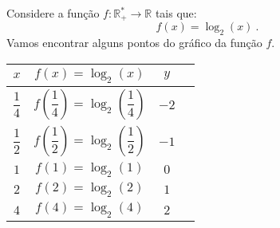  \begin{exem} \label{ex:log-2}
  Considere a função $f: \mathbb{R_{+}^{*}} \rightarrow \mathbb{R} $ tais que:
\begin{equation*}
f(x) = \log_{2}(x) \ .
\end{equation*}
 Vamos encontrar alguns pontos do gráfico da função $f$.

  \begin{table}[H]
 \centering
 \begin{tabular}{|c|c|c|c|} \hline
 \rowcolor{gray}
 $x$ & $f(x) = \log_{2}(x)$ & $y$ \\ \hline
  $\dfrac{1}{4}$ & $f\left(\dfrac{1}{4}\right)= \log_{2}\left(\dfrac{1}{4}\right)$ & $-2$ \\ \hline
 $\dfrac{1}{2}$ & $f\left(\dfrac{1}{2}\right)= \log_{2}\left(\dfrac{1}{2}\right)$ & $-1$ \\ \hline
 $1$ & $f(1)= \log_{2}(1)$ & $0$ \\ \hline
 $2$ & $f(2)= \log_{2}(2)$ & $1$ \\ \hline
 $4$ & $f(4)= \log_{2}(4)$ & $2$ \\ \hline
 \end{tabular}
 \end{table}



\end{exem}
